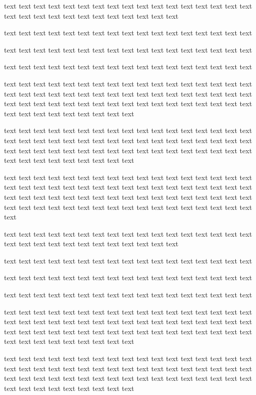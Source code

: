 \documentclass{article}
\begin{document}
    text text text text text text text text text text text text text text text text text text text text text text text text text text text text text

    text text text text text text text text text text text text text text text text text

    text text text text text text text text text text text text text text text text text

    text text text text text text text text text text text text text text text text text

text text text text text text text text text text text text text text text text text text text text text text text text text text text text text text text text text text text text text text text text text text text text text text text text text text text text text text text text text text text text

    text text text text text text text text text text text text text text text text text text text text text text text text text text text text text text text text text text text text text text text text text text text text text text text text text text text text text text text text text text text text

    text text text text text text text text text text text text text text text text text text text text text text text text text text text text text text text text text text text text text text text text text text text text text text text text text text text text text text text text text text text text text text text text text text text text text

    text text text text text text text text text text text text text text text text text text text text text text text text text text text text text

    text text text text text text text text text text text text text text text text text

    text text text text text text text text text text text text text text text text text

    text text text text text text text text text text text text text text text text text

text text text text text text text text text text text text text text text text text text text text text text text text text text text text text text text text text text text text text text text text text text text text text text text text text text text text text text text text text text text text

    text text text text text text text text text text text text text text text text text text text text text text text text text text text text text text text text text text text text text text text text text text text text text text text text text text text text text text text text text text text text
\end{document}

